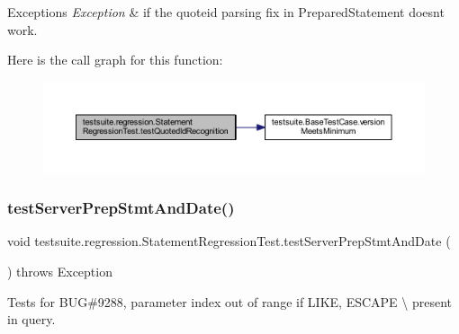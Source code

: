 \begin{DoxyExceptions}{Exceptions}
{\em Exception} & if the quoteid parsing fix in Prepared\+Statement doesn\textquotesingle{}t work. \\
\hline
\end{DoxyExceptions}
Here is the call graph for this function\+:
\nopagebreak
\begin{figure}[H]
\begin{center}
\leavevmode
\includegraphics[width=350pt]{classtestsuite_1_1regression_1_1_statement_regression_test_a0ba6d0aec28125228d181d3e3f340247_cgraph}
\end{center}
\end{figure}
\mbox{\label{classtestsuite_1_1regression_1_1_statement_regression_test_a95273398ebb6f8ab8e39d8ab7d7d7ec2}} 
\subsubsection{\texorpdfstring{test\+Server\+Prep\+Stmt\+And\+Date()}{testServerPrepStmtAndDate()}}
{\footnotesize\ttfamily void testsuite.\+regression.\+Statement\+Regression\+Test.\+test\+Server\+Prep\+Stmt\+And\+Date (\begin{DoxyParamCaption}{ }\end{DoxyParamCaption}) throws Exception}

Tests for B\+UG\#9288, parameter index out of range if L\+I\+KE, E\+S\+C\+A\+PE \textquotesingle{}\textbackslash{}\textquotesingle{} present in query.


